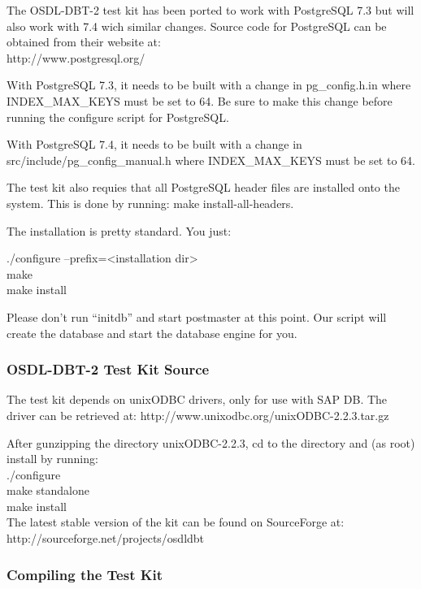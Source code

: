 \documentclass{article}
\begin{document}
The OSDL-DBT-2 test kit has been ported to work with PostgreSQL 7.3 but will
also work with 7.4 wich similar changes.  Source code for PostgreSQL can be
obtained from their website at: \\
\indent http://www.postgresql.org/

\noindent
With PostgreSQL 7.3, it needs to be built with a change in pg\_config.h.in where
INDEX\_MAX\_KEYS must be set to 64.  Be sure to make this change before running
the configure script for PostgreSQL.

\noindent
With PostgreSQL 7.4, it needs to be built with a change in src/include/pg\_config\_manual.h
where INDEX\_MAX\_KEYS must be set to 64.

\noindent
The test kit also requies that all PostgreSQL header files are installed onto
the system.  This is done by running: make install-all-headers.

\noindent
The installation is pretty standard. You just:

\indent ./configure --prefix=<installation dir> \\
\indent make \\
\indent make install

\noindent
Please don't run ``initdb'' and start postmaster at this point. Our script will
create the database and start the database engine for you.

\subsubsection{OSDL-DBT-2 Test Kit Source}

\noindent
The test kit depends on unixODBC drivers, only for use with SAP DB.  The driver
can be retrieved at: http://www.unixodbc.org/unixODBC-2.2.3.tar.gz

\noindent
After gunzipping the directory unixODBC-2.2.3, cd to the directory and (as
root) install by running: \\
\indent ./configure \\
\indent make standalone \\
\indent make install \\

\noindent
The latest stable version of the kit can be found on SourceForge at: \\
\indent http://sourceforge.net/projects/osdldbt

\subsubsection{Compiling the Test Kit}
\end{document}
